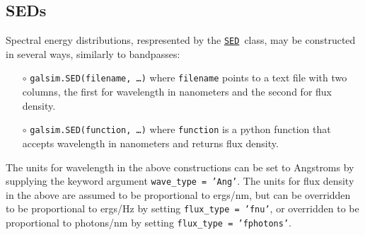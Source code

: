 \documentclass[preprint,10pt]{../../devel/modules/aastex}
\newcommand\SED{\href{http://galsim-developers.github.io/GalSim/classgalsim_1_1sed_1_1_s_e_d.html}{\texttt{SED}}}
\begin{document}
\subsection{SEDs}
Spectral energy distributions, respresented by the \SED\ class,
may be constructed in several ways, similarly to bandpasses:
\begin{itemize}
  \item[$\circ$] 
  \texttt{galsim.SED(filename, \dots)} 
    \newline 
    where \texttt{filename} points to a
    text file with two columns, the first for wavelength in nanometers and the second for flux
    density.
  \item[$\circ$] 
  \texttt{galsim.SED(function, \dots)} 
    \newline 
    where \texttt{function} is a python
    function that accepts wavelength in nanometers and returns flux density.
\end{itemize}

The units for wavelength in the above constructions can be set to Angstroms by supplying the keyword
argument \texttt{wave\_type = 'Ang'}.  The units for flux density in the above are assumed to be
proportional to ergs/nm, but can be overridden to be proportional to ergs/Hz by setting
\texttt{flux\_type = 'fnu'}, or overridden to be proportional to photons/nm by setting
\texttt{flux\_type = 'fphotons'}.
\end{document}
